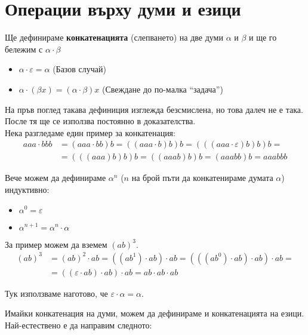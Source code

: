 \section{Операции върху думи и езици}

\begin{definition}
    Ще дефинираме \textbf{конкатенацията} (слепването) на две думи $\alpha$ и $\beta$
    и ще го бележим с $\alpha \cdot \beta$
    \begin{itemize}
        \item $\alpha \cdot \varepsilon = \alpha$ (Базов случай)
        \item $\alpha \cdot (\beta x) = (\alpha \cdot \beta)x$ (Свеждане до по-малка ``задача'')
    \end{itemize}
\end{definition}

На пръв поглед такава дефиниция изглежда безсмислена,
но това далеч не е така.
После тя ще се използва постоянно в доказателства. \\

Нека разгледаме един пример за конкатенация:
\begin{align*}
    aaa \cdot bbb & = (aaa \cdot bb)b = ((aaa \cdot b)b)b = (((aaa \cdot \varepsilon)b)b)b = \\
                  & = (((aaa)b)b)b = ((aaab)b)b = (aaabb)b = aaabbb
\end{align*}

Вече можем да дефинираме $\alpha^n$ ($n$ на брой пъти да конкатенираме думата $\alpha$) индуктивно:
\begin{itemize}
    \item $\alpha^0 = \varepsilon$
    \item $\alpha^{n + 1} = \alpha^n \cdot \alpha$
\end{itemize}

За пример можем да вземем $(ab)^3$.
\begin{align*}
    (ab)^3 & = (ab)^2 \cdot ab = ((ab^1) \cdot ab) \cdot ab = (((ab^0) \cdot ab) \cdot ab) \cdot ab = \\
           & = ((\varepsilon \cdot ab) \cdot ab) \cdot ab = ab \cdot ab \cdot ab
\end{align*}

\begin{remark}
    Тук използваме наготово, че $\varepsilon \cdot \alpha = \alpha$. \\
\end{remark}

Имайки конкатенация на думи, можем да дефинираме и конкатенацията на езици.
Най-естествено е да направим следното:

